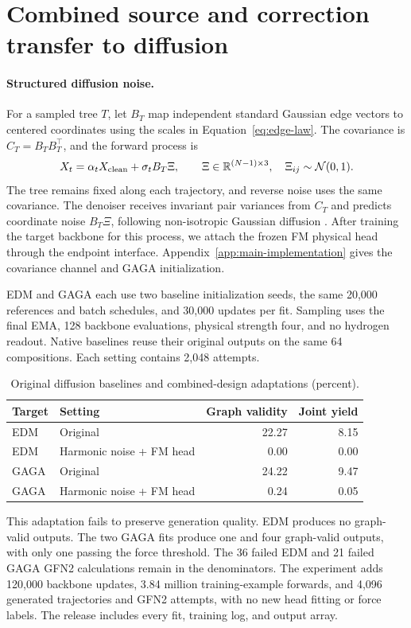 \section{Combined source and correction transfer to diffusion}\label{app:joint-design-transfer}
\paragraph{Structured diffusion noise.}
For a sampled tree $T$, let $B_T$ map independent standard Gaussian edge vectors to centered coordinates using the scales in Equation~\ref{eq:edge-law}. The covariance is $C_T=B_TB_T^\top$, and the forward process is
\begin{equation}
 X_t=\alpha_t X_{\rm clean}+\sigma_t B_T\Xi,
 \qquad \Xi\in\mathbb R^{(N-1)\times3},\quad \Xi_{ij}\sim\mathcal N(0,1).
 \label{eq:structured-diffusion}
\end{equation}
The tree remains fixed along each trajectory, and reverse noise uses the same covariance. The denoiser receives invariant pair variances from $C_T$ and predicts coordinate noise $B_T\Xi$, following non-isotropic Gaussian diffusion \citep{voleti2022nonisotropic}. After training the target backbone for this process, we attach the frozen FM physical head through the endpoint interface. Appendix~\ref{app:main-implementation} gives the covariance channel and GAGA initialization.

EDM and GAGA each use two baseline initialization seeds, the same 20,000 references and batch schedules, and 30,000 updates per fit. Sampling uses the final EMA, 128 backbone evaluations, physical strength four, and no hydrogen readout. Native baselines reuse their original outputs on the same 64 compositions. Each setting contains 2,048 attempts.

\begin{table}[htbp]\centering\small
\caption{Original diffusion baselines and combined-design adaptations (percent).}
\begin{tabular}{llrr}\toprule
Target & Setting & Graph validity & Joint yield\\\midrule
EDM & Original &22.27&8.15\\
EDM & Harmonic noise + FM head &0.00&0.00\\
GAGA & Original &24.22&9.47\\
GAGA & Harmonic noise + FM head &0.24&0.05\\
\bottomrule\end{tabular}\label{tab:joint-design-completed}
\end{table}

This adaptation fails to preserve generation quality. EDM produces no graph-valid outputs. The two GAGA fits produce one and four graph-valid outputs, with only one passing the force threshold. The 36 failed EDM and 21 failed GAGA GFN2 calculations remain in the denominators. The experiment adds 120,000 backbone updates, 3.84 million training-example forwards, and 4,096 generated trajectories and GFN2 attempts, with no new head fitting or force labels. The release includes every fit, training log, and output array.
